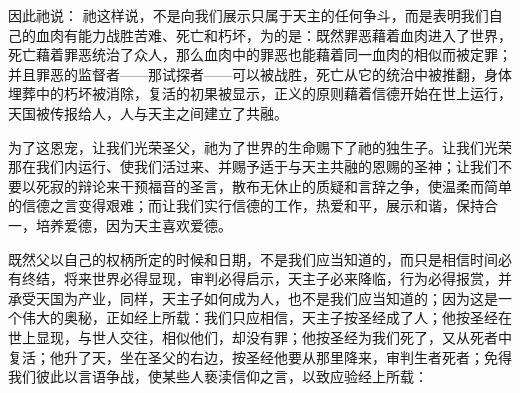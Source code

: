 因此祂说：  祂这样说，不是向我们展示只属于天主的任何争斗，而是表明我们自己的血肉有能力战胜苦难、死亡和朽坏，为的是：既然罪恶藉着血肉进入了世界，死亡藉着罪恶统治了众人，那么血肉中的罪恶也能藉着同一血肉的相似而被定罪；并且罪恶的监督者——那试探者——可以被战胜，死亡从它的统治中被推翻，身体埋葬中的朽坏被消除，复活的初果被显示，正义的原则藉着信德开始在世上运行，天国被传报给人，人与天主之间建立了共融。\par

为了这恩宠，让我们光荣圣父，祂为了世界的生命赐下了祂的独生子。让我们光荣那在我们内运行、使我们活过来、并赐予适于与天主共融的恩赐的圣神；让我们不要以死寂的辩论来干预福音的圣言，散布无休止的质疑和言辞之争，使温柔而简单的信德之言变得艰难；而让我们实行信德的工作，热爱和平，展示和谐，保持合一，培养爱德，因为天主喜欢爱德。\par

既然父以自己的权柄所定的时候和日期，不是我们应当知道的，而只是相信时间必有终结，将来世界必得显现，审判必得启示，天主子必来降临，行为必得报赏，并承受天国为产业，同样，天主子如何成为人，也不是我们应当知道的；因为这是一个伟大的奥秘，正如经上所载：我们只应相信，天主子按圣经成了人；他按圣经在世上显现，与世人交往，相似他们，却没有罪；他按圣经为我们死了，又从死者中复活；他升了天，坐在圣父的右边，按圣经他要从那里降来，审判生者死者；免得我们彼此以言语争战，使某些人亵渎信仰之言，以致应验经上所载：\par

